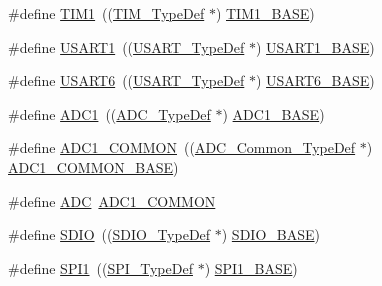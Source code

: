 \begin{DoxyCompactItemize}
\#define \hyperlink{group___peripheral__declaration_ga2e87451fea8dc9380056d3cfc5ed81fb}{T\+I\+M1}~((\hyperlink{struct_t_i_m___type_def}{T\+I\+M\+\_\+\+Type\+Def} $\ast$) \hyperlink{group___peripheral__memory__map_gaf8aa324ca5011b8173ab16585ed7324a}{T\+I\+M1\+\_\+\+B\+A\+SE})
\item 
\#define \hyperlink{group___peripheral__declaration_ga92871691058ff7ccffd7635930cb08da}{U\+S\+A\+R\+T1}~((\hyperlink{struct_u_s_a_r_t___type_def}{U\+S\+A\+R\+T\+\_\+\+Type\+Def} $\ast$) \hyperlink{group___peripheral__memory__map_ga86162ab3f740db9026c1320d46938b4d}{U\+S\+A\+R\+T1\+\_\+\+B\+A\+SE})
\item 
\#define \hyperlink{group___peripheral__declaration_ga2dab39a19ce3dd05fe360dcbb7b5dc84}{U\+S\+A\+R\+T6}~((\hyperlink{struct_u_s_a_r_t___type_def}{U\+S\+A\+R\+T\+\_\+\+Type\+Def} $\ast$) \hyperlink{group___peripheral__memory__map_gade4d3907fd0387ee832f426f52d568bb}{U\+S\+A\+R\+T6\+\_\+\+B\+A\+SE})
\item 
\#define \hyperlink{group___peripheral__declaration_ga90d2d5c526ce5c0a551f533eccbee71a}{A\+D\+C1}~((\hyperlink{struct_a_d_c___type_def}{A\+D\+C\+\_\+\+Type\+Def} $\ast$) \hyperlink{group___peripheral__memory__map_ga695c9a2f892363a1c942405c8d351b91}{A\+D\+C1\+\_\+\+B\+A\+SE})
\item 
\#define \hyperlink{group___peripheral__declaration_gaf1919c64fc774aab31190346fd5457e2}{A\+D\+C1\+\_\+\+C\+O\+M\+M\+ON}~((\hyperlink{struct_a_d_c___common___type_def}{A\+D\+C\+\_\+\+Common\+\_\+\+Type\+Def} $\ast$) \hyperlink{group___peripheral__memory__map_ga1ef44c8e4398bd3b3fbb0c981657f3d0}{A\+D\+C1\+\_\+\+C\+O\+M\+M\+O\+N\+\_\+\+B\+A\+SE})
\item 
\#define \hyperlink{group___peripheral__declaration_ga54d148b91f3d356713f7e367a2243bea}{A\+DC}~\hyperlink{group___peripheral__declaration_gaf1919c64fc774aab31190346fd5457e2}{A\+D\+C1\+\_\+\+C\+O\+M\+M\+ON}
\item 
\#define \hyperlink{group___peripheral__declaration_ga8149aa2760fffac16bc75216d5fd9331}{S\+D\+IO}~((\hyperlink{struct_s_d_i_o___type_def}{S\+D\+I\+O\+\_\+\+Type\+Def} $\ast$) \hyperlink{group___peripheral__memory__map_ga95dd0abbc6767893b4b02935fa846f52}{S\+D\+I\+O\+\_\+\+B\+A\+SE})
\item 
\#define \hyperlink{group___peripheral__declaration_gad483be344a28ac800be8f03654a9612f}{S\+P\+I1}~((\hyperlink{struct_s_p_i___type_def}{S\+P\+I\+\_\+\+Type\+Def} $\ast$) \hyperlink{group___peripheral__memory__map_ga50cd8b47929f18b05efbd0f41253bf8d}{S\+P\+I1\+\_\+\+B\+A\+SE})
\item 

\end{DoxyCompactItemize}
